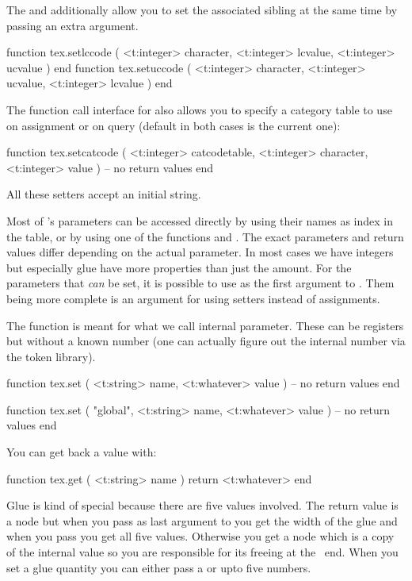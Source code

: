 The  and  additionally allow you to set the
associated sibling at the same time by passing an extra argument.

\starttyping[option=LUA]
function tex.setlccode  ( <t:integer> character, <t:integer> lcvalue, <t:integer> ucvalue ) end
function tex.setuccode  ( <t:integer> character, <t:integer> ucvalue, <t:integer> lcvalue ) end
\stoptyping

The function call interface for  also allows you to specify a
category table to use on assignment or on query (default in both cases is the
current one):

\starttyping[option=LUA]
function tex.setcatcode (
    <t:integer> catcodetable,
    <t:integer> character,
    <t:integer> value
)
    -- no return values
end
\stoptyping

All these setters accept an initial  string.

\stopsubsection

\startsubsection[title={Setters and getters}]

Most of \TEX's parameters can be accessed directly by using their names as index
in the  table, or by using one of the functions  and
. The exact parameters and return values differ depending on the
actual parameter. In most cases we have integers but especially glue have more
properties than just the amount. For the parameters that {\em can} be set, it is
possible to use  as the first argument to . Them
being more complete is an argument for using setters instead of assignments.

The  function is meant for what we call internal parameter. These can
be registers but without a known number (one can actually figure out the internal
number via the token library).

\starttyping[option=LUA]
function tex.set ( <t:string> name, <t:whatever> value )
    -- no return values
end

function tex.set ( "global", <t:string> name, <t:whatever> value )
    -- no return values
end
\stoptyping

You can get back a value with:

\starttyping[option=LUA]
function tex.get ( <t:string> name )
    return <t:whatever>
end
\stoptyping

Glue is kind of special because there are five values involved. The return value
is a  node but when you pass  as last argument to
 you get the width of the glue and when you pass  you
get all five values. Otherwise you get a node which is a copy of the internal
value so you are responsible for its freeing at the \LUA\ end. When you set a
glue quantity you can either pass a  or upto five numbers.

